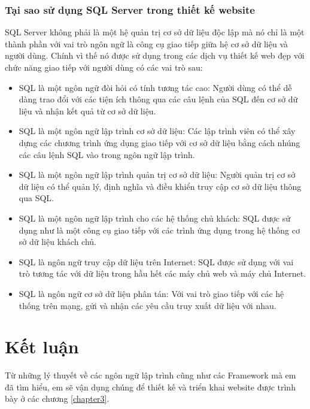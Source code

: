 \subsubsection{Tại sao sử dụng SQL Server trong thiết kế website}
SQL Server không phải là một hệ quản trị cơ sở dữ liệu độc lập mà nó chỉ là một thành phần với vai trò ngôn ngữ là công cụ giao tiếp giữa hệ cơ sở dữ liệu và người dùng. Chính vì thế nó được sử dụng trong các dịch vụ thiết kế web đẹp với chức năng giao tiếp với người dùng có các vai trò sau:
\begin{itemize}
\item	SQL là một ngôn ngữ đòi hỏi có tính tương tác cao: Người dùng có thể dễ dàng trao đổi với các tiện ích thông qua các câu lệnh của SQL đến cơ sở dữ liệu và nhận kết quả từ cơ sở dữ liệu.
\item	SQL là một ngôn ngữ lập trình cơ sở dữ liệu: Các lập trình viên có thể xây dựng các chương trình ứng dụng giao tiếp với cơ sở dữ liệu bằng cách nhúng các câu lệnh SQL vào trong ngôn ngữ lập trình.
\item	SQL là một ngôn ngữ lập trình quản trị cơ sở dữ liệu: Người quản trị cơ sở dữ liệu có thể quản lý, định nghĩa và điều khiển truy cập cơ sở dữ liệu thông qua SQL.
\item	SQL là một ngôn ngữ lập trình cho các hệ thống chủ khách: SQL được sử dụng như là một công cụ giao tiếp với các trình ứng dụng trong hệ thống cơ sở dữ liệu khách chủ.
\item	SQL là ngôn ngữ truy cập dữ liệu trên Internet: SQL được sử dụng với vai trò tương tác với dữ liệu trong hầu hết các máy chủ web và máy chủ Internet.
\item	SQL là ngôn ngữ cơ sở dữ liệu phân tán: Với vai trò giao tiếp với các hệ thống trên mạng, gửi và nhận các yêu cầu truy xuất dữ liệu với nhau.

\end{itemize}

\section{Kết luận}
Từ những lý thuyết về các ngôn ngữ lập trình cũng như các Framework mà em đã tìm hiểu, em sẽ vận dụng chúng để thiết kế và triển khai website được trình bày ở các chương \ref{chapter3}.

 




